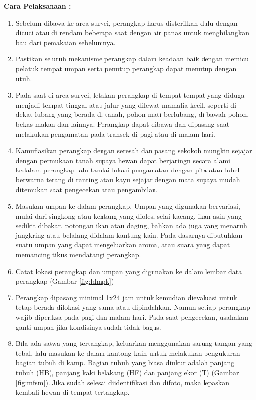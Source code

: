 \documentclass[
  oneside]{book}
\providecommand{\tightlist}{%
  \setlength{\itemsep}{0pt}\setlength{\parskip}{0pt}}
\begin{document}
\textbf{Cara Pelaksanaan :}

\begin{enumerate}
\def\labelenumi{\arabic{enumi}.}
\tightlist
\item
  Sebelum dibawa ke area survei, perangkap harus disterilkan dulu dengan dicuci atau di rendam beberapa saat dengan air panas untuk menghilangkan bau dari pemakaian sebelumnya.
\item
  Pastikan seluruh mekanisme perangkap dalam keadaan baik dengan memicu pelatuk tempat umpan serta penutup perangkap dapat menutup dengan utuh.
\item
  Pada saat di area survei, letakan perangkap di tempat-tempat yang diduga menjadi tempat tinggal atau jalur yang dilewat mamalia kecil, seperti di dekat lubang yang berada di tanah, pohon mati berlubang, di bawah pohon, bekas makan dan lainnya. Perangkap dapat dibawa dan dipasang saat melakukan pengamatan pada transek di pagi atau di malam hari.
\item
  Kamuflasikan perangkap dengan seresah dan pasang sekokoh mungkin sejajar dengan permukaan tanah supaya hewan dapat berjaringn secara alami kedalam perangkap lalu tandai lokasi pengamatan dengan pita atau label berwarna terang di ranting atau kayu sejajar dengan mata supaya mudah ditemukan saat pengecekan atau pengambilan.
\item
  Masukan umpan ke dalam perangkap. Umpan yang digunakan bervariasi, mulai dari singkong atau kentang yang diolesi selai kacang, ikan asin yang sedikit dibakar, potongan ikan atau daging, bahkan ada juga yang menaruh jangkring atau belalang didalam kantung kain. Pada dasarnya dibutuhkan suatu umpan yang dapat mengeluarkan aroma, atau suara yang dapat memancing tikus mendatangi perangkap.
\item
  Catat lokasi perangkap dan umpan yang digunakan ke dalam lembar data perangkap (Gambar \ref{fig:ldmpk})
\item
  Perangkap dipasang minimal 1x24 jam untuk kemudian dievaluasi untuk tetap berada dilokasi yang sama atau dipindahkan. Namun setiap perangkap wajib diperiksa pada pagi dan malam hari. Pada saat pengecekan, usahakan ganti umpan jika kondisinya sudah tidak bagus.
\item
  Bila ada satwa yang tertangkap, keluarkan menggunakan sarung tangan yang tebal, lalu masukan ke dalam kantong kain untuk melakukan pengukuran bagian tubuh di kamp. Bagian tubuh yang biasa diukur adalah panjang tubuh (HB), panjang kaki belakang (HF) dan panjang ekor (T) (Gambar \ref{fig:mfsm}). Jika sudah selesai diidentifikasi dan difoto, maka lepaskan kembali hewan di tempat tertangkap.
\end{enumerate}
\end{document}
